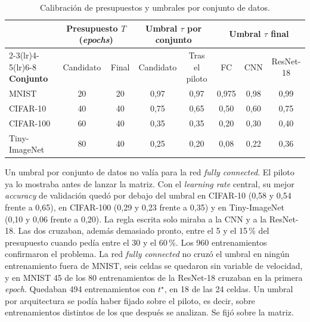 \begin{table}[ht]
\centering
\small
\setlength{\tabcolsep}{3pt}
\caption{Calibración de presupuestos y umbrales por conjunto de datos.}
\label{tab:calibracion}
\label{tab:umbrales}
\begin{tabular}{lccccccc}
\toprule
& \multicolumn{2}{c}{\textbf{Presupuesto $T$ (\emph{epochs})}} & \multicolumn{2}{c}{\textbf{Umbral $\tau$ por conjunto}} & \multicolumn{3}{c}{\textbf{Umbral $\tau$ final}} \\
\cmidrule(lr){2-3}\cmidrule(lr){4-5}\cmidrule(lr){6-8}
\textbf{Conjunto} & Candidato & Final & Candidato & Tras el piloto & FC & CNN & ResNet-18 \\
\midrule
MNIST          & 20 & 20 & 0,97 & 0,97 & 0,975 & 0,98 & 0,99 \\
CIFAR-10       & 40 & 40 & 0,75 & 0,65 & 0,50  & 0,60 & 0,75 \\
CIFAR-100      & 60 & 40 & 0,35 & 0,35 & 0,20  & 0,30 & 0,40 \\
Tiny-ImageNet  & 80 & 40 & 0,25 & 0,20 & 0,08  & 0,22 & 0,36 \\
\bottomrule
\end{tabular}
\end{table}

Un umbral por conjunto de datos no valía para la red \emph{fully connected}. El piloto ya lo mostraba antes de lanzar la matriz. Con el \emph{learning rate} central, su mejor \emph{accuracy} de validación quedó por debajo del umbral en CIFAR-10 (0,58 y 0,54 frente a 0,65), en CIFAR-100 (0,29 y 0,23 frente a 0,35) y en Tiny-ImageNet (0,10 y 0,06 frente a 0,20). La regla escrita solo miraba a la CNN y a la ResNet-18. Las dos cruzaban, además demasiado pronto, entre el 5 y el 15\,\% del presupuesto cuando pedía entre el 30 y el 60\,\%. Los 960 entrenamientos confirmaron el problema. La red \emph{fully connected} no cruzó el umbral en ningún entrenamiento fuera de MNIST, seis celdas se quedaron sin variable de velocidad, y en MNIST 45 de los 80 entrenamientos de la ResNet-18 cruzaban en la primera \emph{epoch}. Quedaban 494 entrenamientos con $t^\star$, en 18 de las 24 celdas. Un umbral por arquitectura se podía haber fijado sobre el piloto, es decir, sobre entrenamientos distintos de los que después se analizan. Se fijó sobre la matriz.

